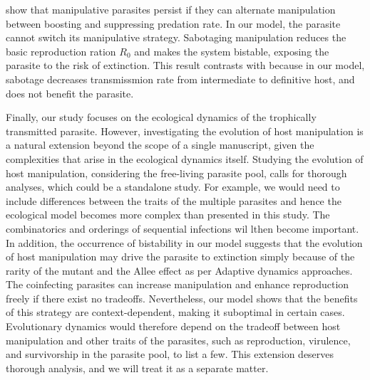 \documentclass[a4paper]{scrartcl}
\begin{document}
\cite{Iritani2018} show that manipulative parasites persist if they can alternate manipulation between boosting and suppressing predation rate. 
In our model, the parasite cannot switch its manipulative strategy. 
Sabotaging manipulation reduces the basic reproduction ration $R_0$ and makes the system bistable, exposing the parasite to the risk of extinction. This result contrasts with \cite{Iritani2018} because in our model, sabotage decreases transmissmion rate from intermediate to definitive host, and does not benefit the parasite.

Finally, our study focuses on the ecological dynamics of the trophically transmitted parasite. 
However, investigating the evolution of host manipulation is a natural extension beyond the scope of a single manuscript, given the complexities that arise in the ecological dynamics itself.
Studying the evolution of host manipulation, considering the free-living parasite pool, calls for thorough analyses, which could be a standalone study. 
For example, we would need to include differences between the traits of the multiple parasites and hence the ecological model becomes more complex than presented in this study.
The combinatorics and orderings of sequential infections wil lthen become important.
In addition, the occurrence of bistability in our model suggests that the evolution of host manipulation may drive the parasite to extinction simply because of the rarity of the mutant and the Allee effect as per Adaptive dynamics approaches. 
The coinfecting parasites can increase manipulation and enhance reproduction freely if there exist no tradeoffs. 
Nevertheless, our model shows that the benefits of this strategy are context-dependent, making it suboptimal in certain cases. 
Evolutionary dynamics would therefore depend on the tradeoff between host manipulation and other traits of the parasites, such as reproduction, virulence, and survivorship in the parasite pool, to list a few. 
This extension deserves thorough analysis, and we will treat it as a separate matter.






\end{document}

